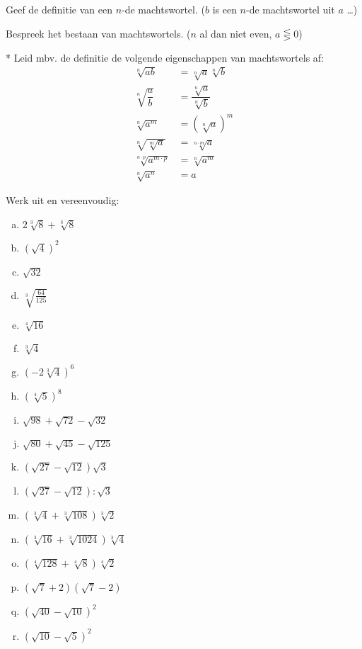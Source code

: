 \documentclass[12pt,twoside]{article}
\begin{document}
\begin{oefening}
Geef de definitie van een $n$-de machtswortel. ($b$ is een $n$-de machtswortel uit $a$ \ldots)
\end{oefening}

\begin{oefening}
Bespreek het bestaan van machtswortels. ($n$ al dan niet even, $a \lesseqgtr 0$)
\end{oefening}

\begin{oefening}*
Leid mbv. de definitie de volgende eigenschappen van machtswortels af:
\begin{align*}
  \sqrt[n]{ab} &= \sqrt[n]{a}\sqrt[n]{b}\\
  \sqrt[n]{\dfrac{a}{b}} &= \dfrac{\sqrt[n]{a}}{\sqrt[n]{b}}\\
  \sqrt[n]{a^m} &= \left(\sqrt[n]{a}\right)^m\\
  \sqrt[n]{\sqrt[m]{a}} &= \sqrt[n\cdot m]{a}\\
  \sqrt[n\cdot p]{a^{m\cdot p}} &= \sqrt[n]{a^m}\\
  \sqrt[n]{a^n} &= a
\end{align*}
\end{oefening}

\begin{oefening}
Werk uit en vereenvoudig:
\begin{multicols}{3}
\begin{enumerate}[(a)]
  \itemsep.5em
  \item $2\sqrt[3]{8}+\sqrt[3]{8}$
  \item $\left(\sqrt{4}\right)^2$
  \item $\sqrt{32}$
  \item $\sqrt[3]{\frac{64}{125}}$
  \item $\sqrt[4]{16}$
  \item $\sqrt[3]{4}$
  \item $\left(-2\sqrt[3]{4}\right)^6$
  \item $\left(\sqrt[4]{5}\right)^8$
  \item $\sqrt{98}+\sqrt{72}-\sqrt{32}$
  \item $\sqrt{80}+\sqrt{45}-\sqrt{125}$
  \item $\left(\sqrt{27}-\sqrt{12}\right)\sqrt{3}$
  \item $\left(\sqrt{27}-\sqrt{12}\right):\sqrt{3}$
  \item $\left(\sqrt[3]{4}+\sqrt[3]{108}\right)\sqrt[3]{2}$
  \item $\left(\sqrt[3]{16}+\sqrt[3]{1024}\right)\sqrt[3]{4}$
  \item $\left(\sqrt[4]{128}+\sqrt[4]{8}\right)\sqrt[4]{2}$
  \item $\left(\sqrt{7}+2\right)\left(\sqrt{7}-2\right)$
  \item $\left(\sqrt{40}-\sqrt{10}\right)^2$
  \item $\left(\sqrt{10}-\sqrt{5}\right)^2$
\end{enumerate}
\end{multicols}
\end{oefening}
\end{document}
